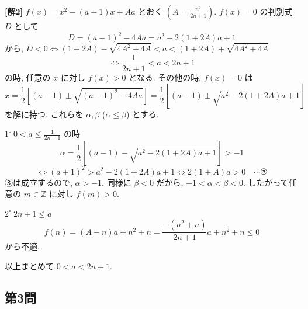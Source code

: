 \documentclass[../main.tex]{subfiles}
\begin{document}
\begin{center}
\end{center}

\bigskip

\noindent
\textbf{[解2]} $f(x) = x^2 - (a-1)x + Aa$ とおく $\left(A = \frac{n^2}{2n+1}\right)$. $f(x)=0$ の判別式 $D$ として
\[
  D = (a-1)^2 - 4Aa = a^2 - 2(1+2A)a + 1
\]
から, $D < 0 \iff (1+2A) - \sqrt{4A^2+4A} < a < (1+2A) + \sqrt{4A^2+4A}$
\[
  \iff \frac{1}{2n+1} < a < 2n+1
\]
の時, 任意の $x$ に対し $f(x) > 0$ となる. その他の時, $f(x)=0$ は
\[
  x = \frac{1}{2}\left[ (a-1) \pm \sqrt{(a-1)^2 - 4Aa} \right] = \frac{1}{2}\left[ (a-1) \pm \sqrt{a^2 - 2(1+2A)a + 1} \right]
\]
を解に持つ. これらを $\alpha, \beta$ ($\alpha \le \beta$) とする.

\bigskip

\noindent
$1^\circ \ 0 < a \le \frac{1}{2n+1}$ の時
\[
  \alpha = \frac{1}{2}\left[ (a-1) - \sqrt{a^2-2(1+2A)a+1} \right] > -1
\]
\[
  \iff (a+1)^2 > a^2 - 2(1+2A)a + 1 \iff 2(1+A)a > 0 \quad \cdots \text{③}
\]
③は成立するので, $\alpha > -1$. 同様に $\beta < 0$ だから, $-1 < \alpha < \beta < 0$.
したがって任意の $m \in \mathbb{Z}$ に対し $f(m) > 0$.

\bigskip

\noindent
$2^\circ \ 2n+1 \le a$
\[
  f(n) = (A-n)a + n^2 + n = \frac{-(n^2+n)}{2n+1} a + n^2 + n \le 0
\]
から不適.

\bigskip

\noindent
以上まとめて $0 < a < 2n+1$.

\newpage

\subsection*{第3問}
\end{document}
